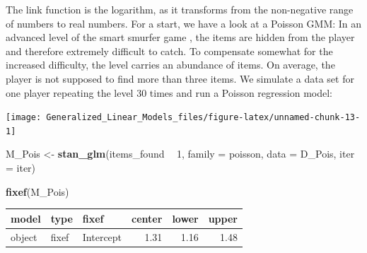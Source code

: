\documentclass[]{svmono}
\newenvironment{Shaded}{\begin{snugshade}}{\end{snugshade}}
\newcommand{\KeywordTok}[1]{\textcolor[rgb]{0.13,0.29,0.53}{\textbf{#1}}}
\newcommand{\DataTypeTok}[1]{\textcolor[rgb]{0.13,0.29,0.53}{#1}}
\newcommand{\DecValTok}[1]{\textcolor[rgb]{0.00,0.00,0.81}{#1}}
\newcommand{\FloatTok}[1]{\textcolor[rgb]{0.00,0.00,0.81}{#1}}
\newcommand{\StringTok}[1]{\textcolor[rgb]{0.31,0.60,0.02}{#1}}
\newcommand{\OperatorTok}[1]{\textcolor[rgb]{0.81,0.36,0.00}{\textbf{#1}}}
\newcommand{\NormalTok}[1]{#1}
\begin{document}
The link function is the logarithm, as it transforms from the
non-negative range of numbers to real numbers. For a start, we have a
look at a Poisson GMM: In an advanced level of the smart smurfer game ,
the items are hidden from the player and therefore extremely difficult
to catch. To compensate somewhat for the increased difficulty, the level
carries an abundance of items. On average, the player is not supposed to
find more than three items. We simulate a data set for one player
repeating the level 30 times and run a Poisson regression model:

\begin{Shaded}
\end{Shaded}

\texttt{[image: Generalized\_Linear\_Models\_files/figure-latex/unnamed-chunk-13-1]}

\begin{Shaded}
\begin{Highlighting}[]
\NormalTok{M_Pois <-}\StringTok{ }
\StringTok{  }\KeywordTok{stan_glm}\NormalTok{(items_found }\OperatorTok{~}\StringTok{ }\DecValTok{1}\NormalTok{,}
           \DataTypeTok{family =}\NormalTok{ poisson,}
           \DataTypeTok{data =}\NormalTok{ D_Pois, }\DataTypeTok{iter =}\NormalTok{ iter)}
\end{Highlighting}
\end{Shaded}

\begin{Shaded}
\begin{Highlighting}[]
\KeywordTok{fixef}\NormalTok{(M_Pois)}
\end{Highlighting}
\end{Shaded}

\begin{longtable}[]{@{}lllrrr@{}}
\toprule
model & type & fixef & center & lower & upper\tabularnewline
\midrule
\endhead
object & fixef & Intercept & 1.31 & 1.16 & 1.48\tabularnewline
\bottomrule
\end{longtable}
\end{document}
